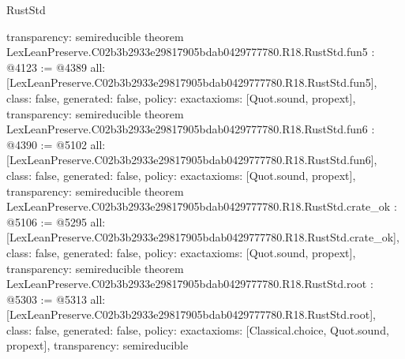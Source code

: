 \begin{lexlean}{RustStd}
\begin{coremodule}
{  transparency: semireducible
}
theorem LexLeanPreserve.C02b3b2933e29817905bdab0429777780.R18.RustStd.fun5 : @4123 := @4389 {
  all: [LexLeanPreserve.C02b3b2933e29817905bdab0429777780.R18.RustStd.fun5],
  class: false,
  generated: false,
  policy: exact{axioms: [Quot.sound, propext]},
  transparency: semireducible
}
theorem LexLeanPreserve.C02b3b2933e29817905bdab0429777780.R18.RustStd.fun6 : @4390 := @5102 {
  all: [LexLeanPreserve.C02b3b2933e29817905bdab0429777780.R18.RustStd.fun6],
  class: false,
  generated: false,
  policy: exact{axioms: [Quot.sound, propext]},
  transparency: semireducible
}
theorem LexLeanPreserve.C02b3b2933e29817905bdab0429777780.R18.RustStd.crate_ok : @5106 := @5295 {
  all: [LexLeanPreserve.C02b3b2933e29817905bdab0429777780.R18.RustStd.crate_ok],
  class: false,
  generated: false,
  policy: exact{axioms: [Quot.sound, propext]},
  transparency: semireducible
}
theorem LexLeanPreserve.C02b3b2933e29817905bdab0429777780.R18.RustStd.root : @5303 := @5313 {
  all: [LexLeanPreserve.C02b3b2933e29817905bdab0429777780.R18.RustStd.root],
  class: false,
  generated: false,
  policy: exact{axioms: [Classical.choice, Quot.sound, propext]},
  transparency: semireducible
}


\end{coremodule}
\end{lexlean}
